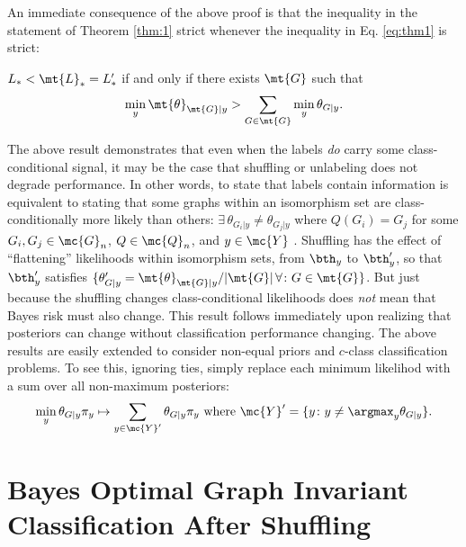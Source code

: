 \documentclass[10pt,journal,cspaper,compsoc]{IEEEtran}
\newcommand{\Qs}{Q}
\begin{document}
An immediate consequence of the above proof is that the inequality in the statement of Theorem \ref{thm:1} strict whenever the inequality in Eq. \eqref{eq:thm1} is strict:

\begin{thm}
	$L_* < \mt{L}_*=L'_*$ if and only if there exists $\mt{G}$ such that
	$$\min_y \mt{\theta}_{\mt{G}|y} > \sum_{G \in \mt{G}}\min_y \theta_{G|y}.$$
\end{thm}
The above result demonstrates that even when the labels \emph{do} carry some class-conditional signal, it may be the case that shuffling or unlabeling does not degrade performance.  In other words, to state that labels contain information is equivalent to stating that some graphs within an isomorphism set are class-conditionally more likely than others: $\exists \, \theta_{G_i|y} \neq \theta_{G_j|y}$ where $\Qs(G_i)=G_j$ for some $G_i,G_j \in \mc{G}_n$, $\Qs \in \mc{Q}_n$, and $y \in \mc{Y}$%
.  Shuffling has the effect of ``flattening'' likelihoods within isomorphism sets, from $\bth_y$ to $\bth_y'$, so that $\bth_y'$ satisfies $\{\theta_{G|y}'=\mt{\theta}_{\mt{G}|y}/|\mt{G}| \, \forall \colon G \in \mt{G}\}$.  But just because the shuffling changes class-conditional likelihoods does \emph{not} mean that Bayes risk must also change. This result follows immediately upon realizing that posteriors can change without classification performance changing.  The above results are easily extended to consider non-equal priors and $c$-class classification problems.  To see this, ignoring ties, simply replace each minimum likelihod with a sum over all non-maximum posteriors: 
$$\min_y \theta_{G|y} \pi_y \mapsto \sum_{y \in \mc{Y}'} \theta_{G|y} \pi_y \text{ where } \mc{Y}' =\{y \colon y \neq \argmax_y \theta_{G|y}\}.$$


\section{Bayes Optimal Graph Invariant Classification After Shuffling} %
\label{sec:gi}
\end{document}
